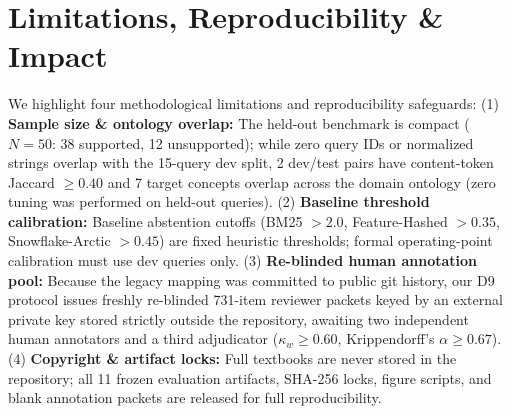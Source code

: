 \documentclass[sigconf]{acmart}
\begin{document}
\section{Limitations, Reproducibility \& Impact}
We highlight four methodological limitations and reproducibility safeguards:
(1) \textbf{Sample size \& ontology overlap:} The held-out benchmark is compact
($N=50$: 38 supported, 12 unsupported); while zero query IDs or normalized strings
overlap with the 15-query dev split, 2 dev/test pairs have content-token Jaccard
$\ge 0.40$ and 7 target concepts overlap across the domain ontology (zero tuning was
performed on held-out queries).
(2) \textbf{Baseline threshold calibration:} Baseline abstention cutoffs (BM25 $>2.0$,
Feature-Hashed $>0.35$, Snowflake-Arctic $>0.45$) are fixed heuristic thresholds; formal
operating-point calibration must use dev queries only.
(3) \textbf{Re-blinded human annotation pool:} Because the legacy
 mapping was committed to public git history,
our D9 protocol issues freshly re-blinded 731-item reviewer packets keyed by an
external private key stored strictly outside the repository, awaiting two independent
human annotators and a third adjudicator ($\kappa_w \ge 0.60$, Krippendorff's
$\alpha \ge 0.67$).
(4) \textbf{Copyright \& artifact locks:} Full textbooks are never stored in the
repository; all 11 frozen evaluation artifacts, SHA-256 locks, figure scripts, and
blank annotation packets are released for full reproducibility.



\end{document}
